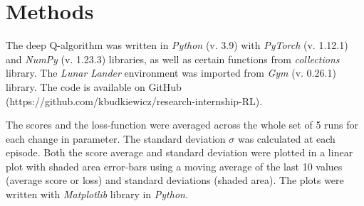 \documentclass{article}
\begin{document}
\newpage
{}
\section*{Methods}
The deep Q-algorithm was written in \textit{Python} (v. 3.9) with \textit{PyTorch} (v. 1.12.1) and \textit{NumPy} (v. 1.23.3) libraries, as well as certain functions from \textit{collections} library. The \textit{Lunar Lander} environment was imported from \textit{Gym} (v. 0.26.1) library. The code is available on GitHub (https://github.com/kbudkiewicz/research-internship-RL).

The scores and the loss-function were averaged across the whole set of 5 runs for each change in parameter. The standard deviation $\sigma$ was calculated at each episode. Both the score average and standard deviation were plotted in a linear plot with shaded area error-bars using a moving average of the last 10 values (average score or loss) and standard deviations (shaded area). The plots were written with \textit{Matplotlib} library in \textit{Python}.




\end{document}

